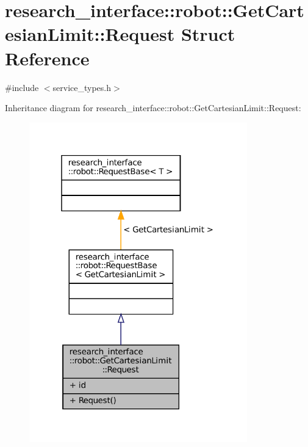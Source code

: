 \hypertarget{structresearch__interface_1_1robot_1_1GetCartesianLimit_1_1Request}{}\section{research\+\_\+interface\+:\+:robot\+:\+:Get\+Cartesian\+Limit\+:\+:Request Struct Reference}
\label{structresearch__interface_1_1robot_1_1GetCartesianLimit_1_1Request}


{\ttfamily \#include $<$service\+\_\+types.\+h$>$}



Inheritance diagram for research\+\_\+interface\+:\+:robot\+:\+:Get\+Cartesian\+Limit\+:\+:Request\+:
\nopagebreak
\begin{figure}[H]
\begin{center}
\leavevmode
\includegraphics[width=268pt]{structresearch__interface_1_1robot_1_1GetCartesianLimit_1_1Request__inherit__graph}
\end{center}
\end{figure}


